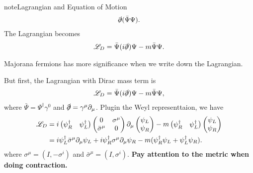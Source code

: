 \documentclass[letterpaper,12pt,english]{sphinxmanual}
\begin{document}
\begin{notice}{note}{Lagrangian and Equation of Motion}
\begin{gather}
\begin{split}\slashed{\partial} (\bar\Psi \Psi).\end{split}\notag
\end{gather}
The Lagrangian becomes
\begin{gather}
\begin{split}\mathscr{L}_D = \bar\Psi (i\slashed{\partial} ) \Psi -  m \bar\Psi \Psi.\end{split}\notag
\end{gather}\end{notice}

Majorana fermions has more significance when we write down the Lagrangian.

But first, the Lagrangian with Dirac mass term is
\begin{gather}
\begin{split}\mathscr{L}_D = \bar\Psi (i\slashed{\partial} ) \Psi -  m \bar\Psi \Psi,\end{split}\notag
\end{gather}
where \(\bar\Psi = \Psi^\dagger\gamma^0\) and \(\slashed{\partial} = \gamma^\mu \partial_\mu\). Plugin the Weyl representtaion, we have
\begin{gather}
\begin{split}\mathscr{L}_D &= i\begin{pmatrix}\psi_R^\dagger & \psi_L^\dagger \end{pmatrix} \begin{pmatrix} 0 & \sigma^\mu \\  \bar\sigma^\mu & 0 \end{pmatrix} \partial _\mu \begin{pmatrix} \psi_L \\ \psi_R \end{pmatrix} - m\begin{pmatrix}\psi_R^\dagger & \psi_L^\dagger \end{pmatrix}  \begin{pmatrix} \psi_L \\ \psi_R \end{pmatrix} \\
& = i\psi_L^\dagger \bar\sigma^\mu \partial _\mu \psi_L + i \psi_R^\dagger \sigma^\mu \partial_\mu \psi_R - m (\psi_R^\dagger \psi_L + \psi_L^\dagger \psi_R).\end{split}\notag
\end{gather}
where \(\sigma^\mu = (I,-\sigma^i)\) and \(\bar\sigma^\mu = (I,\sigma^i)\). \textbf{Pay attention to the metric when doing contraction.}
\end{document}
